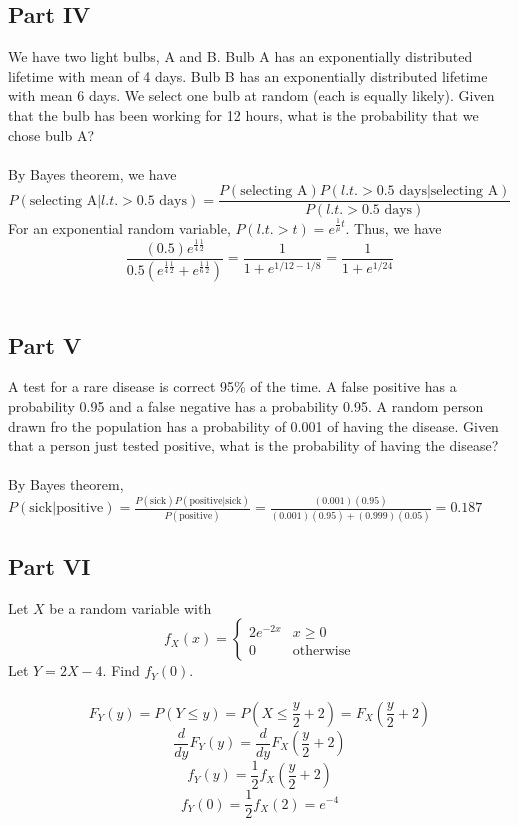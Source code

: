\documentclass{amsart}
\begin{document}
	\subsection{Part IV}
	We have two light bulbs, A and B. Bulb A has an exponentially distributed lifetime with mean of 4 days. Bulb B has an exponentially distributed lifetime with mean 6 days. We select one bulb at random (each is equally likely). Given that the bulb has been working for 12 hours, what is the probability that we chose bulb A?\\
	\\
	By Bayes theorem, we have
	\[
	P(\text{selecting A}|l.t.>\text{0.5 days})=
	\frac{P(\text{selecting A})P(l.t.>\text{0.5 days}|\text{selecting A})}{P(l.t.>\text{0.5 days})}
	\]
	For an exponential random variable, $P(l.t.> t)=
	e^{\frac{1}{\mu}t}$.
	Thus, we have
	\[
	\frac{(0.5)e^{\frac{1}{4}\frac{1}{2}}}{0.5(e^{\frac{1}{4}\frac{1}{2}}+e^{\frac{1}{6}\frac{1}{2}})} = \frac{1}{1+e^{1/12 - 1/8}} = \frac{1}{1+e^{1/24}}
	\]
	\\
	\subsection{Part V}
	A test for a rare disease is correct 95\% of the time. A false positive has a probability 0.95 and a false negative has a probability 0.95. A random person drawn fro the population has a probability of 0.001 of having the disease. Given that a person just tested positive, what is the probability of having the disease?\\
	\\
	By Bayes theorem,\\
	$P(\text{sick}|\text{positive})=
	\frac{P(\text{sick})P(\text{positive}|\text{sick})}{P(\text{positive})} = \frac{(0.001)(0.95)}{(0.001)(0.95)+(0.999)(0.05)}=0.187$
	\\
	\subsection{Part VI}
	Let $X$ be a random variable with
	\[
	f_X(x) = 
	\begin{cases}
		 2e^{-2x} & x\geq 0\\
		 0 & \text{otherwise}
	\end{cases}
	\]
	Let $Y=2X-4$. Find $f_Y(0)$.\\
	\\
	\[
	F_Y(y) = P(Y\leq y) = P\left(X \leq \frac{y}{2}+2\right) = F_X\left(\frac{y}{2}+2\right)
	\]
	\[
	\frac{d}{dy}F_Y(y) = \frac{d}{dy}F_X\left(\frac{y}{2}+2\right)
	\]
	\[
	f_Y(y) = \frac{1}{2}f_X\left(\frac{y}{2}+2\right)
	\]
	\[
	f_Y(0) = \frac{1}{2}f_X(2)= e^{-4}
	\]
	\\
\end{document}
